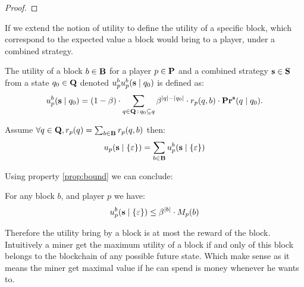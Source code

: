 \begin{proof}
\end{proof}

If we extend the notion of utility to define the utility of a specific block, which correspond to the expected value a block would bring to a player, under a combined strategy.
\begin{mydef}
The utility of a block $b \in \text{\bf B}$ for a player $p \in \mathbf{P}$ and a combined strategy $\mathbf{s} \in \mathbf{S}$ from a state $q_0 \in \mathbf{Q}$ denoted $u_p^bu_p^b(\mathbf{s} \mid q_0)$ is defined as:
\begin{equation*}
u_p^b(\mathbf{s} \mid q_0) =  (1 - \beta) \cdot  \sum_{q \in \mathbf{Q} \,:\, q_0 \subseteq q} \beta^{|q|-|q_0|} \cdot  r_p(q,b) \cdot \mathbf{Pr}^{\mathbf{s}}(q \mid q_0).
\end{equation*}
\end{mydef}

\begin{mylem*}
Assume $\forall q \in \mathbf{Q}, r_p(q) = \sum_{b \in \text{\bf B}} r_p(q,b)$ then:
\begin{equation*}
u_p(\mathbf{s} \mid \{\varepsilon\}) =   \sum_{b \in \mathbf{B}} u^b_p(\mathbf{s} \mid \{\varepsilon\})
\end{equation*}
\end{mylem*}

Using property \ref{prop:bound} we can conclude:
\begin{mylem}
For any block $b$, and player $p$ we have:
\begin{equation*}
u_p^b(\mathbf{s} \mid \{\varepsilon\}) \leq \beta^{|b|} \cdot M_p(b)
\end{equation*}
\end{mylem}

Therefore the utility bring by a block is at most the reward of the block. Intuitively a miner get the maximum utility of a block if and only of this block belongs to the blockchain of any possible future state. Which make sense as it means the miner get maximal value if he can spend is money whenever he wants to.





